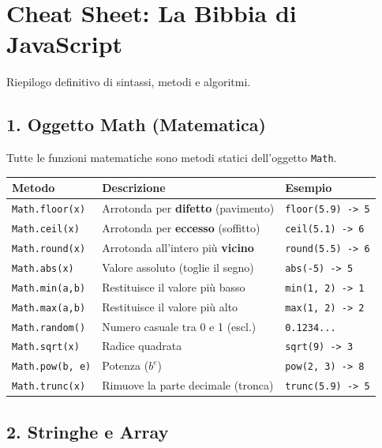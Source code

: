 \newpage
\section{Cheat Sheet: La Bibbia di JavaScript}
Riepilogo definitivo di sintassi, metodi e algoritmi.

\subsection{1. Oggetto Math (Matematica)}
Tutte le funzioni matematiche sono metodi statici dell'oggetto \texttt{Math}.

\begin{center}
\begin{tabular}{|l|p{5cm}|l|}
\hline
\textbf{Metodo} & \textbf{Descrizione} & \textbf{Esempio} \\
\hline
\texttt{Math.floor(x)} & Arrotonda per \textbf{difetto} (pavimento) & \texttt{floor(5.9) -> 5} \\
\hline
\texttt{Math.ceil(x)} & Arrotonda per \textbf{eccesso} (soffitto) & \texttt{ceil(5.1) -> 6} \\
\hline
\texttt{Math.round(x)} & Arrotonda all'intero più \textbf{vicino} & \texttt{round(5.5) -> 6} \\
\hline
\texttt{Math.abs(x)} & Valore assoluto (toglie il segno) & \texttt{abs(-5) -> 5} \\
\hline
\texttt{Math.min(a,b)} & Restituisce il valore più basso & \texttt{min(1, 2) -> 1} \\
\hline
\texttt{Math.max(a,b)} & Restituisce il valore più alto & \texttt{max(1, 2) -> 2} \\
\hline
\texttt{Math.random()} & Numero casuale tra 0 e 1 (escl.) & \texttt{0.1234...} \\
\hline
\texttt{Math.sqrt(x)} & Radice quadrata & \texttt{sqrt(9) -> 3} \\
\hline
\texttt{Math.pow(b, e)} & Potenza ($b^e$) & \texttt{pow(2, 3) -> 8} \\
\hline
\texttt{Math.trunc(x)} & Rimuove la parte decimale (tronca) & \texttt{trunc(5.9) -> 5} \\
\hline
\end{tabular}
\end{center}

\subsection{2. Stringhe e Array}


